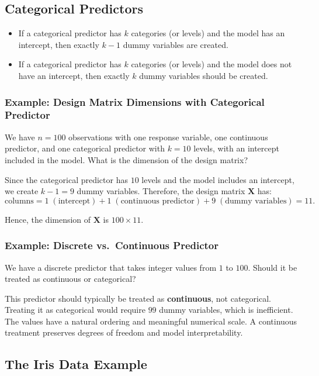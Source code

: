 \subsection{Categorical Predictors}

\begin{itemize}
    \item If a categorical predictor has $k$ categories (or levels) and the model has an intercept, then exactly $k - 1$ dummy variables are created.
    \item If a categorical predictor has $k$ categories (or levels) and the model does not have an intercept, then exactly $k$ dummy variables should be created.
\end{itemize}

\subsubsection*{Example: Design Matrix Dimensions with Categorical Predictor}

We have $n = 100$ observations with one response variable, one continuous predictor, and one categorical predictor with $k = 10$ levels, with an intercept included in the model. What is the dimension of the design matrix?

Since the categorical predictor has $10$ levels and the model includes an intercept, we create $k-1 = 9$ dummy variables. Therefore, the design matrix $\mathbf{X}$ has:
\[
\text{columns} = 1 \;(\text{intercept}) + 1 \;(\text{continuous predictor}) + 9 \;(\text{dummy variables}) = 11.
\]

Hence, the dimension of $\mathbf{X}$ is $\boxed{100 \times 11}$.

\subsubsection*{Example: Discrete vs.\ Continuous Predictor}

We have a discrete predictor that takes integer values from $1$ to $100$. Should it be treated as continuous or categorical?

This predictor should typically be treated as \textbf{continuous}, not categorical. Treating it as categorical would require $99$ dummy variables, which is inefficient. The values have a natural ordering and meaningful numerical scale. A continuous treatment preserves degrees of freedom and model interpretability.

\subsection{The Iris Data Example}

